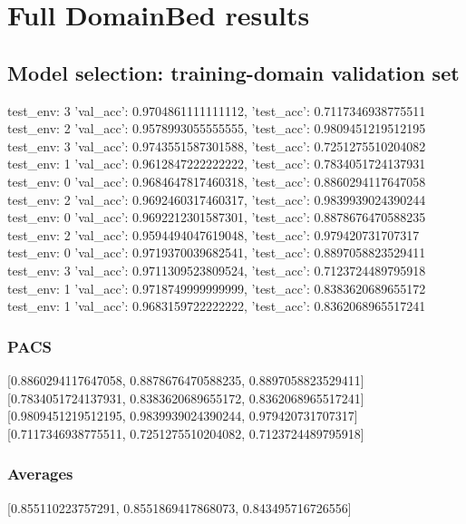 \documentclass{article}
\begin{document}
\section{Full DomainBed results}

\subsection{Model selection: training-domain validation set}
test_env: 3
{'val_acc': 0.9704861111111112, 'test_acc': 0.7117346938775511}
test_env: 2
{'val_acc': 0.9578993055555555, 'test_acc': 0.9809451219512195}
test_env: 3
{'val_acc': 0.9743551587301588, 'test_acc': 0.7251275510204082}
test_env: 1
{'val_acc': 0.9612847222222222, 'test_acc': 0.7834051724137931}
test_env: 0
{'val_acc': 0.9684647817460318, 'test_acc': 0.8860294117647058}
test_env: 2
{'val_acc': 0.9692460317460317, 'test_acc': 0.9839939024390244}
test_env: 0
{'val_acc': 0.9692212301587301, 'test_acc': 0.8878676470588235}
test_env: 2
{'val_acc': 0.9594494047619048, 'test_acc': 0.979420731707317}
test_env: 0
{'val_acc': 0.9719370039682541, 'test_acc': 0.8897058823529411}
test_env: 3
{'val_acc': 0.9711309523809524, 'test_acc': 0.7123724489795918}
test_env: 1
{'val_acc': 0.9718749999999999, 'test_acc': 0.8383620689655172}
test_env: 1
{'val_acc': 0.9683159722222222, 'test_acc': 0.8362068965517241}

\subsubsection{PACS}
[0.8860294117647058, 0.8878676470588235, 0.8897058823529411]
[0.7834051724137931, 0.8383620689655172, 0.8362068965517241]
[0.9809451219512195, 0.9839939024390244, 0.979420731707317]
[0.7117346938775511, 0.7251275510204082, 0.7123724489795918]

\begin{center}
\end{center}

\subsubsection{Averages}
[0.855110223757291, 0.8551869417868073, 0.843495716726556]

\begin{center}
\end{center}
\end{document}
